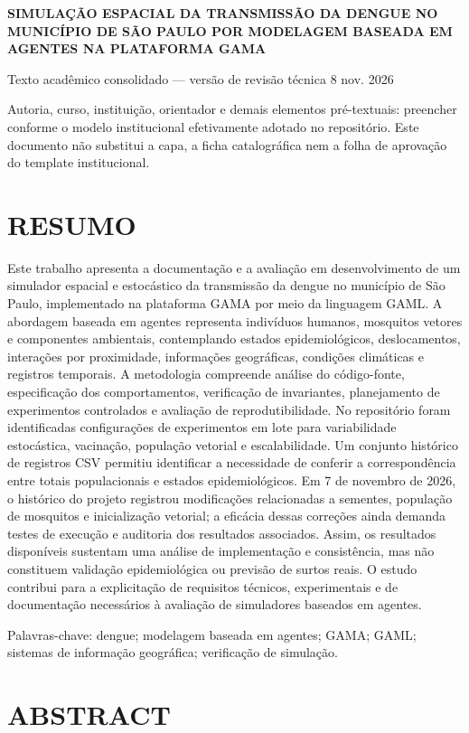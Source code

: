 \textbf{SIMULAÇÃO ESPACIAL DA TRANSMISSÃO DA DENGUE NO MUNICÍPIO DE SÃO
PAULO POR MODELAGEM BASEADA EM AGENTES NA PLATAFORMA GAMA}

Texto acadêmico consolidado --- versão de revisão técnica \textbar{} 8
nov. 2026

Autoria, curso, instituição, orientador e demais elementos pré-textuais:
preencher conforme o modelo institucional efetivamente adotado no
repositório. Este documento não substitui a capa, a ficha catalográfica
nem a folha de aprovação do template institucional.

\section{RESUMO}\label{resumo}

Este trabalho apresenta a documentação e a avaliação em desenvolvimento
de um simulador espacial e estocástico da transmissão da dengue no
município de São Paulo, implementado na plataforma GAMA por meio da
linguagem GAML. A abordagem baseada em agentes representa indivíduos
humanos, mosquitos vetores e componentes ambientais, contemplando
estados epidemiológicos, deslocamentos, interações por proximidade,
informações geográficas, condições climáticas e registros temporais. A
metodologia compreende análise do código-fonte, especificação dos
comportamentos, verificação de invariantes, planejamento de experimentos
controlados e avaliação de reprodutibilidade. No repositório foram
identificadas configurações de experimentos em lote para variabilidade
estocástica, vacinação, população vetorial e escalabilidade. Um conjunto
histórico de registros CSV permitiu identificar a necessidade de
conferir a correspondência entre totais populacionais e estados
epidemiológicos. Em 7 de novembro de 2026, o histórico do projeto
registrou modificações relacionadas a sementes, população de mosquitos e
inicialização vetorial; a eficácia dessas correções ainda demanda testes
de execução e auditoria dos resultados associados. Assim, os resultados
disponíveis sustentam uma análise de implementação e consistência, mas
não constituem validação epidemiológica ou previsão de surtos reais. O
estudo contribui para a explicitação de requisitos técnicos,
experimentais e de documentação necessários à avaliação de simuladores
baseados em agentes.

Palavras-chave: dengue; modelagem baseada em agentes; GAMA; GAML;
sistemas de informação geográfica; verificação de simulação.

\section{ABSTRACT}\label{abstract}

